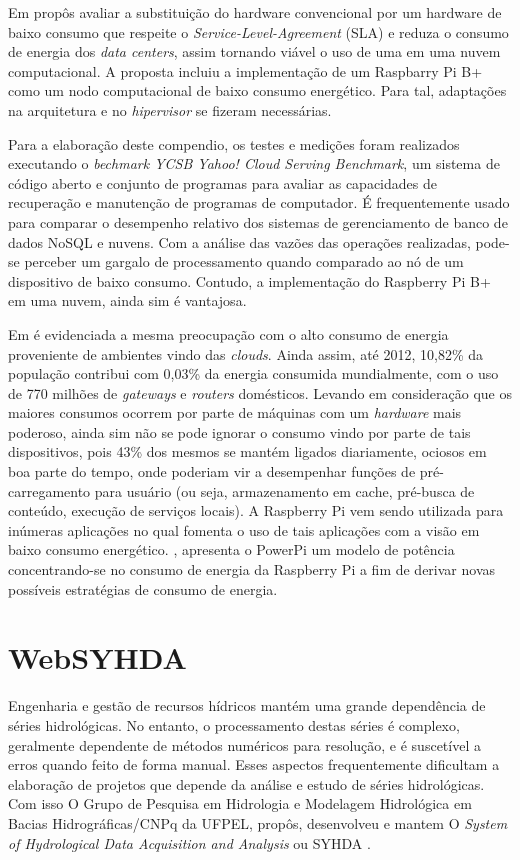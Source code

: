 \documentclass[12pt,english,brazil]{article}
\begin{document}
Em \cite{Joao} propôs avaliar a substituição do hardware convencional por um hardware de baixo consumo que respeite o \emph{Service-Level-Agreement} (SLA) e reduza o consumo de energia dos \emph{data centers}, assim tornando viável o uso de uma em uma nuvem computacional. A proposta incluiu a implementação de um Raspbarry Pi B+ como um nodo computacional de baixo consumo energético. Para tal, adaptações na arquitetura e no \emph{hipervisor} se fizeram necessárias.

Para a elaboração deste compendio, os testes e medições foram realizados executando o \emph{bechmark YCSB Yahoo! Cloud Serving Benchmark}, um sistema de código aberto e conjunto de programas para avaliar as capacidades de recuperação e manutenção de programas de computador. É frequentemente usado para comparar o desempenho relativo dos sistemas de gerenciamento de banco de dados NoSQL e nuvens. Com a análise das vazões das operações realizadas, pode-se perceber um gargalo de processamento quando comparado ao nó de um dispositivo de baixo consumo. Contudo, a implementação do Raspberry Pi B+ em uma nuvem, ainda sim é vantajosa.

Em \cite{PiConsumo} é evidenciada a mesma preocupação com o alto consumo de energia proveniente de ambientes vindo das \emph{clouds}. Ainda assim, até 2012, 10,82\% da população contribui com 0,03\% da energia consumida mundialmente, com o uso de 770 milhões de \emph{gateways} e \emph{routers} domésticos. Levando em consideração que os maiores consumos ocorrem por parte de máquinas com um \emph{hardware} mais poderoso, ainda sim não se pode ignorar o consumo vindo por parte de tais dispositivos, pois 43\% dos mesmos se mantém ligados diariamente, ociosos em boa parte do tempo, onde poderiam vir a desempenhar funções de pré-carregamento para usuário (ou seja, armazenamento em cache, pré-busca de conteúdo, execução de serviços locais). A Raspberry Pi vem sendo utilizada para inúmeras aplicações no qual fomenta o uso de tais aplicações com a visão em baixo consumo energético. \cite{PiConsumo}, apresenta o PowerPi um modelo de  potência concentrando-se no consumo de energia da Raspberry Pi a fim de derivar novas possíveis estratégias de consumo de energia.



\section{WebSYHDA}\label{sec:WebSYHDA}

Engenharia e gestão de recursos hídricos mantém uma grande dependência de séries hidrológicas. No entanto, o processamento destas séries é complexo, geralmente dependente de métodos numéricos para resolução, e é suscetível a erros quando feito de forma manual. Esses aspectos frequentemente dificultam a elaboração de projetos que depende da análise e estudo de séries hidrológicas. Com isso O Grupo de Pesquisa em Hidrologia e Modelagem Hidrológica em Bacias Hidrográficas/CNPq da UFPEL, propôs, desenvolveu e mantem O \emph{System of Hydrological Data Acquisition and Analysis} ou SYHDA \cite{syhda}.
\end{document}
